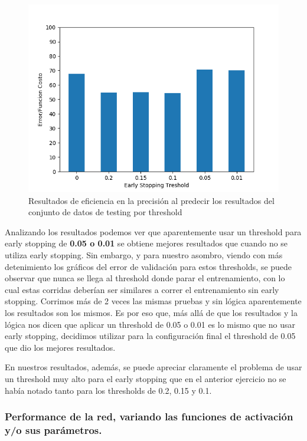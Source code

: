 \begin{figure}[!htbp]
  \begin{center}
  \includegraphics[scale=0.60]{graficos/ej2/early_stopping_testing.png}
  \caption{Resultados de eficiencia en la precisión al predecir los resultados del conjunto de datos de testing por threshold}
  \end{center}
\end{figure}

Analizando los resultados podemos ver que aparentemente usar un threshold para early stopping de \textbf{0.05 o 0.01} se obtiene mejores resultados 
que cuando no se utiliza early stopping. Sin embargo, y para nuestro asombro, viendo con más detenimiento los gráficos del error de validación para 
estos thresholds, se puede observar que nunca se llega al threshold donde parar el entrenamiento, con lo cual estas corridas deberían ser similares
a correr el entrenamiento sin early stopping. Corrimos más de 2 veces las mismas pruebas y sin lógica aparentemente los resultados son los mismos. 
Es por eso que, más allá de que los resultados y la lógica nos dicen que aplicar un threshold de 0.05 o 0.01 es lo mismo que no usar early stopping, 
decidimos utilizar para la configuración final el threshold de 0.05 que dio los mejores resultados.

En nuestros resultados, además, se puede apreciar claramente el problema de usar un threshold muy alto para el early stopping que en el anterior ejercicio
 no se había notado tanto para los thresholds de 0.2, 0.15 y 0.1.

\subsubsection{Performance de la red, variando las funciones de activación y/o sus parámetros.}

